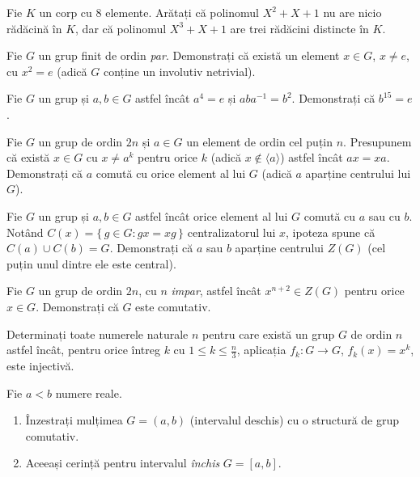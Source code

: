 \begin{problema}
Fie $K$ un corp cu 8 elemente. Arătați că polinomul $X^2+X+1$ nu are nicio rădăcină în $K$, dar că polinomul $X^3+X+1$ are trei rădăcini distincte în $K$.
\end{problema}

\begin{problema}[Clasică]
Fie $G$ un grup finit de ordin \emph{par}. Demonstrați că există
un element $x \in G$, $x \neq e$, cu $x^{2}=e$ (adică $G$ conține
un involutiv netrivial).
\end{problema}

\begin{problema}[Clasică]
Fie $G$ un grup și $a,b \in G$ astfel încât $a^{4}=e$ și
$aba^{-1}=b^{2}$. Demonstrați că $b^{15}=e$.
\end{problema}

\begin{problema}
Fie $G$ un grup de ordin $2n$ și $a \in G$ un element de ordin cel
puțin $n$. Presupunem că există $x \in G$ cu $x \neq a^{k}$
pentru orice $k$ (adică $x \notin \langle a\rangle$) astfel încât
$ax=xa$. Demonstrați că $a$ comută cu orice element al lui $G$
(adică $a$ aparține centrului lui $G$).
\end{problema}

\begin{problema}
Fie $G$ un grup și $a,b \in G$ astfel încât orice element al
lui $G$ comută cu $a$ sau cu $b$. Notând $C(x)=\{\,g\in G : gx=xg\,\}$
centralizatorul lui $x$, ipoteza spune că $C(a)\cup C(b)=G$.
Demonstrați că $a$ sau $b$ aparține centrului $Z(G)$ (cel
puțin unul dintre ele este central).
\end{problema}

\begin{problema}
Fie $G$ un grup de ordin $2n$, cu $n$ \emph{impar}, astfel încât
$x^{n+2}\in Z(G)$ pentru orice $x\in G$. Demonstrați că $G$ este
comutativ.
\end{problema}

\begin{problema}
Determinați toate numerele naturale $n$ pentru care există un grup
$G$ de ordin $n$ astfel încât, pentru orice întreg $k$ cu
$1\le k\le \tfrac{n}{3}$, aplicația $f_{k}:G\to G$, $f_{k}(x)=x^{k}$,
este injectivă.
\end{problema}

\begin{problema}[Clasică]
Fie $a<b$ numere reale.
\begin{enumerate}[label=(\alph*),nosep]
  \item Înzestrați mulțimea $G=(a,b)$ (intervalul deschis) cu o
        structură de grup comutativ.
  \item Aceeași cerință pentru intervalul \emph{închis}
        $G=[a,b]$.
\end{enumerate}
\end{problema}

